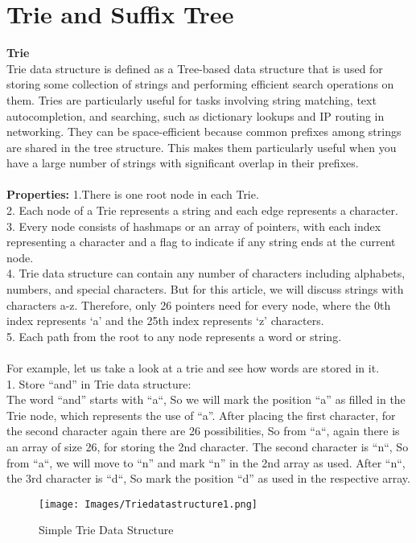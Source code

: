 \documentclass[11pt,a4paper]{article}
\begin{document}

\section{Trie and Suffix Tree}
\textbf{Trie}
\label{sec:introduction}
\\
Trie data structure is defined as a Tree-based data structure that is used for storing some collection of strings and performing efficient search operations on them. Tries are particularly useful for tasks involving string matching, text autocompletion, and searching, such as dictionary lookups and IP routing in networking. They can be space-efficient because common prefixes among strings are shared in the tree structure. This makes them particularly useful when you have a large number of strings with significant overlap in their prefixes.
\\
\\
\textbf{Properties:} 1.There is one root node in each Trie.
\\
2. Each node of a Trie represents a string and each edge represents a character.
\\
3. Every node consists of hashmaps or an array of pointers, with each index representing a character and a flag to indicate if any string ends at the current node.
\\
4. Trie data structure can contain any number of characters including alphabets, numbers, and special characters. But for this article, we will discuss strings with characters a-z. Therefore, only 26 pointers need for every node, where the 0th index represents ‘a’ and the 25th index represents ‘z’ characters.
\\
5. Each path from the root to any node represents a word or string.
\\
\\
For example, let us take a look at a trie and see how words are stored in it.
\\ 
1. Store “and” in Trie data structure:
\\ 
The word “and” starts with “a“, So we will mark the position “a” as filled in the Trie node, which represents the use of “a”. After placing the first character, for the second character again there are 26 possibilities, So from “a“, again there is an array of size 26, for storing the 2nd character. The second character is “n“, So from “a“, we will move to “n” and mark “n” in the 2nd array as used. After “n“, the 3rd character is “d“, So mark the position “d” as used in the respective array.
\\
\begin{figure}[H]
    \centering
    \texttt{[image: Images/Triedatastructure1.png]}
    \caption{Simple Trie Data Structure}
    \label{fig:TrieExample}
\end{figure}
\end{document}

